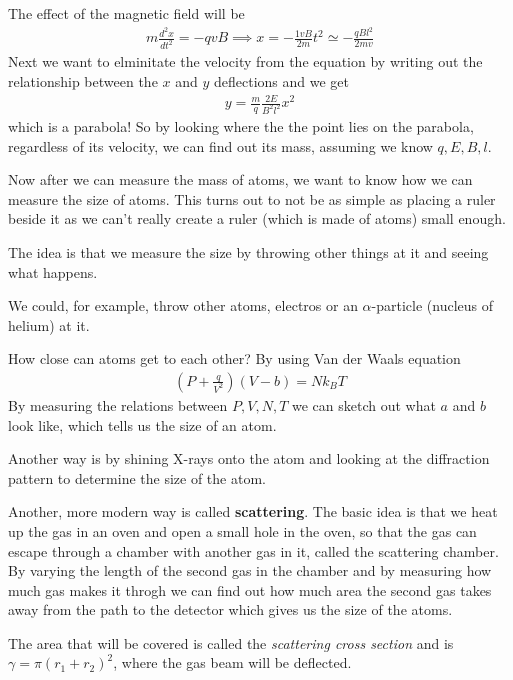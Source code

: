 The effect of the magnetic field will be 
\begin{align*}
	m \frac{d^2 x}{d t^2} = -qvB \implies x = -\frac{1vB}{2m}t^2 \simeq -\frac{qBl^2}{2mv}
\end{align*}
Next we want to elminitate the velocity from the equation by writing out the relationship between the $x$ and $y$ deflections and we get
\begin{align*}
	y = \frac{m}{q} \frac{2E}{B^2l^2}x^2
\end{align*}
which is a parabola! So by looking where the the point lies on the parabola, regardless of its velocity, we can find out its mass, assuming we know $q, E, B, l$.

Now after we can measure the mass of atoms, we want to know how we can measure the size of atoms. This turns out to not be as simple as placing a ruler beside it as we can't really create a ruler (which is made of atoms) small enough.

The idea is that we measure the size by throwing other things at it and seeing what happens.

We could, for example, throw other atoms, electros or an $\alpha$-particle (nucleus of helium) at it.

How close can atoms get to each other? By using Van der Waals equation
\begin{align*}
	(P + \frac{q}{V^2})(V - b) = Nk_B T
\end{align*}
By measuring the relations between $P,V,N,T$ we can sketch out what $a$ and $b$ look like, which tells us the size of an atom.

Another way is by shining X-rays onto the atom and looking at the diffraction pattern to determine the size of the atom.

Another, more modern way is called \textbf{scattering}. The basic idea is that we heat up the gas in an oven and open a small hole in the oven, so that the gas can escape through a chamber with another gas in it, called the scattering chamber. By varying the length of the second gas in the chamber and by measuring how much gas makes it throgh we can find out how much area the second gas takes away from the path to the detector which gives us the size of the atoms.

The area that will be covered is called the \emph{scattering cross section} and is $\gamma = \pi(r_1 + r_2)^2$, where the gas beam will be deflected.\\

